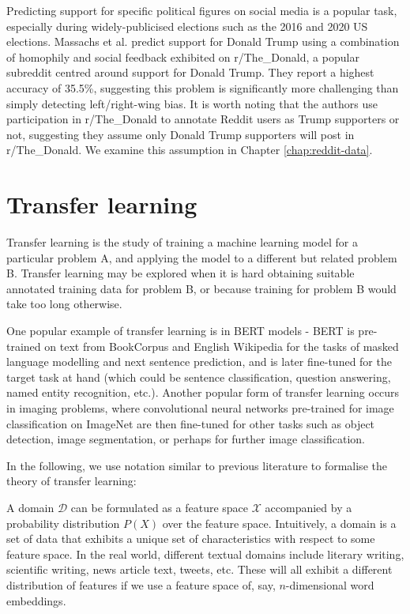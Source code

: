 Predicting support for specific political figures on social media is a popular task, especially during widely-publicised elections such as the 2016 and 2020 US elections. Massachs et al. \cite{massachs} predict support for Donald Trump using a combination of homophily and social feedback exhibited on r/The\_Donald, a popular subreddit centred around support for Donald Trump. They report a highest accuracy of 35.5\%, suggesting this problem is significantly more challenging than simply detecting left/right-wing bias. It is worth noting that the authors use participation in r/The\_Donald to annotate Reddit users as Trump supporters or not, suggesting they assume only Donald Trump supporters will post in r/The\_Donald. We examine this assumption in Chapter \ref{chap:reddit-data}.

\section{Transfer learning} \label{sec:transfer-learning}

Transfer learning is the study of training a machine learning model for a particular problem A, and applying the model to a different but related problem B. Transfer learning may be explored when it is hard obtaining suitable annotated training data for problem B, or because training for problem B would take too long otherwise.

One popular example of transfer learning is in BERT models - BERT is pre-trained on text from BookCorpus and English Wikipedia \cite{bert} for the tasks of masked language modelling and next sentence prediction, and is later fine-tuned for the target task at hand (which could be sentence classification, question answering, named entity recognition, etc.). Another popular form of transfer learning occurs in imaging problems, where convolutional neural networks pre-trained for image classification on ImageNet are then fine-tuned for other tasks such as object detection, image segmentation, or perhaps for further image classification.

In the following, we use notation similar to previous literature \cite{ruder} \cite{pan-survey} to formalise the theory of transfer learning:

A domain $ \mathcal{D} $ can be formulated as a feature space $ \mathcal{X} $ accompanied by a probability distribution $ P(X) $ over the feature space. Intuitively, a domain is a set of data that exhibits a unique set of characteristics with respect to some feature space. In the real world, different textual domains include literary writing, scientific writing, news article text, tweets, etc. These will all exhibit a different distribution of features if we use a feature space of, say, $n$-dimensional word embeddings.

